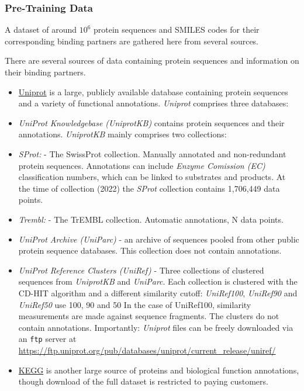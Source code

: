 \documentclass[16pt]{book}
\begin{document}
\subsubsection{Pre-Training Data}

A dataset of around $10^6$ protein sequences and SMILES codes for their corresponding binding partners are gathered here from several sources.

There are several sources of data containing protein sequences and information on their binding partners.

\begin{itemize}
	\item \href{https://www.uniprot.org/}{Uniprot} is a large, publicly available database containing protein sequences and a variety of functional annotations. 
		\textit{Uniprot} comprises three databases:
	\item \textit{UniProt Knowledgebase (UniprotKB)} contains protein sequences and their annotations.
		\textit{UniprotKB} mainly comprises two collections:
\item \textit{SProt:} - The SwissProt collection. Manually annotated and non-redundant protein sequences. 
	Annotations can include \textit{Enzyme Comission (EC)} classification numbers, which can be linked to substrates and products. 
		At the time of collection (2022) the \textit{SProt} collection contains 1,706,449 data points.
	\item \textit{Trembl:} - The TrEMBL collection. Automatic annotations, N data points.
	\item \textit{UniProt Archive (UniParc)} - an archive of sequences pooled from other public protein sequence databases.
	This collection does not contain annotations.
\item \textit{UniProt Reference Clusters (UniRef)} - Three collections of clustered sequences from \textit{UniprotKB} and \textit{UniParc}. 
	Each collection is clustered with the CD-HIT algorithm and a different similarity cutoff: \textit{UniRef100}, \textit{UniRef90} and \textit{UniRef50} use 100, 90 and 50%
	In the case of UniRef100, similarity measurements are made against sequence fragments.
	The clusters do not contain annotations.
		Importantly: \textit{Uniprot} files can be freely downloaded via an \texttt{ftp} server at \href{https://ftp.uniprot.org/pub/databases/uniprot/current_release/uniref/}{https://ftp.uniprot.org/pub/databases/uniprot/current\_release/uniref/}
	\item \href{https://www.genome.jp/kegg/}{KEGG} is another large source of proteins and biological function annotations, though download of the full dataset is restricted to paying customers.

\end{itemize}
\end{document}

